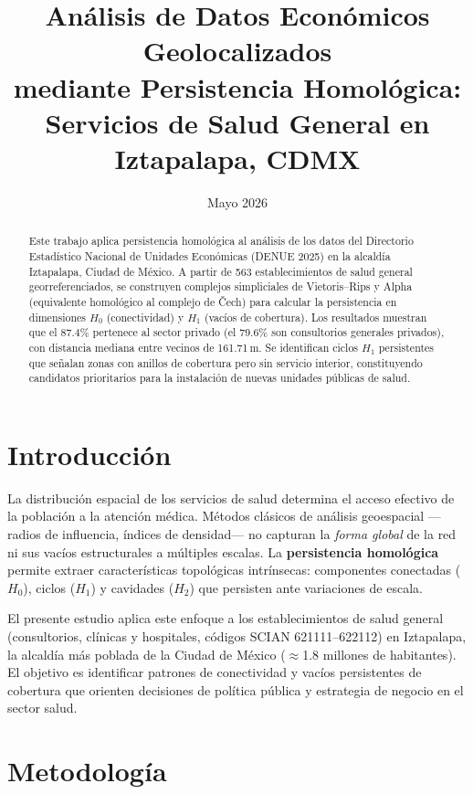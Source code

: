\documentclass[twocolumn, 10pt]{article}
\title{%
  \large\textbf{Análisis de Datos Económicos Geolocalizados}\\
  \textbf{mediante Persistencia Homológica:}\\
  \textbf{Servicios de Salud General en Iztapalapa, CDMX}
}
\author{%
}
\date{Mayo 2026}
\begin{document}
\maketitle
\thispagestyle{empty}

\begin{abstract}
Este trabajo aplica persistencia homológica al análisis de los datos
del Directorio Estadístico Nacional de Unidades Económicas (DENUE 2025)
en la alcaldía Iztapalapa, Ciudad de México.
A partir de 563 establecimientos de salud general georreferenciados,
se construyen complejos simpliciales de Vietoris--Rips y Alpha
(equivalente homológico al complejo de \v{C}ech) para calcular la
persistencia en dimensiones $H_0$ (conectividad) y $H_1$ (vacíos de
cobertura).
Los resultados muestran que el $87.4\%$ pertenece al sector privado
(el $79.6\%$ son consultorios generales privados), con distancia
mediana entre vecinos de 161.71\,m.
Se identifican ciclos $H_1$ persistentes que señalan zonas con anillos
de cobertura pero sin servicio interior, constituyendo candidatos
prioritarios para la instalación de nuevas unidades públicas de salud.
\end{abstract}

\section{Introducción}

La distribución espacial de los servicios de salud determina el acceso
efectivo de la población a la atención médica.
Métodos clásicos de análisis geoespacial —radios de influencia,
índices de densidad— no capturan la \emph{forma global} de la red ni
sus vacíos estructurales a múltiples escalas.
La \textbf{persistencia homológica} permite extraer características
topológicas intrínsecas: componentes conectadas ($H_0$), ciclos ($H_1$)
y cavidades ($H_2$) que persisten ante variaciones de escala.

El presente estudio aplica este enfoque a los establecimientos de
salud general (consultorios, clínicas y hospitales, códigos SCIAN
621111--622112) en Iztapalapa, la alcaldía más poblada de la Ciudad
de México ($\approx$1.8 millones de habitantes).
El objetivo es identificar patrones de conectividad y vacíos
persistentes de cobertura que orienten decisiones de política pública
y estrategia de negocio en el sector salud.

\section{Metodología}
\end{document}
